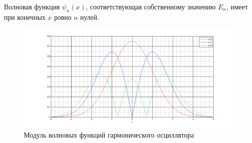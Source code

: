 \begin{thm}
Волновая функция $\psi_n(x)$, соответствующая собственному значению $E_n$, имеет при конечных $x$ ровно $n$ нулей.
\end{thm}

\begin{figure}[h]
  \centering
  \includegraphics[scale=0.3]{figs/7_2}
  \caption{Модуль волновых функций гармонического осциллятора}
  \label{fig:7_2}
\end{figure}
